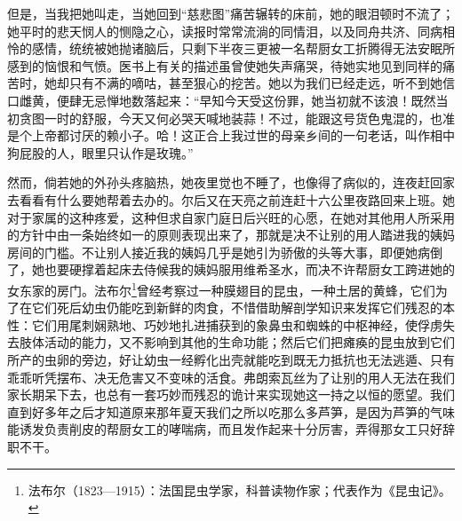 \par 但是，当我把她叫走，当她回到“慈悲图”痛苦辗转的床前，她的眼泪顿时不流了；她平时的悲天悯人的恻隐之心，读报时常常流淌的同情泪，以及同舟共济、同病相怜的感情，统统被她抛诸脑后，只剩下半夜三更被一名帮厨女工折腾得无法安眠所感到的恼恨和气愤。医书上有关的描述虽曾使她失声痛哭，待她实地见到同样的痛苦时，她却只有不满的嘀咕，甚至狠心的挖苦。她以为我们已经走远，听不到她信口雌黄，便肆无忌惮地数落起来：“早知今天受这份罪，她当初就不该浪！既然当初贪图一时的舒服，今天又何必哭天喊地装蒜！不过，能跟这号货色鬼混的，也准是个上帝都讨厌的赖小子。哈！这正合上我过世的母亲乡间的一句老话，叫作相中狗屁股的人，眼里只认作是玫瑰。”
\par 然而，倘若她的外孙头疼脑热，她夜里觉也不睡了，也像得了病似的，连夜赶回家去看看有什么要她帮着去办的。尔后又在天亮之前连赶十六公里夜路回来上班。她对于家属的这种疼爱，这种但求自家门庭日后兴旺的心愿，在她对其他用人所采用的方针中由一条始终如一的原则表现出来了，那就是决不让别的用人踏进我的姨妈房间的门槛。不让别人接近我的姨妈几乎是她引为骄傲的头等大事，即便她病倒了，她也要硬撑着起床去侍候我的姨妈服用维希圣水，而决不许帮厨女工跨进她的女东家的房门。法布尔\footnote{法布尔（1823—1915）：法国昆虫学家，科普读物作家；代表作为《昆虫记》。}曾经考察过一种膜翅目的昆虫，一种土居的黄蜂，它们为了在它们死后幼虫仍能吃到新鲜的肉食，不惜借助解剖学知识来发挥它们残忍的本性：它们用尾刺娴熟地、巧妙地扎进捕获到的象鼻虫和蜘蛛的中枢神经，使俘虏失去肢体活动的能力，又不影响到其他的生命功能；然后它们把瘫痪的昆虫放到它们所产的虫卵的旁边，好让幼虫一经孵化出壳就能吃到既无力抵抗也无法逃遁、只有乖乖听凭摆布、决无危害又不变味的活食。弗朗索瓦丝为了让别的用人无法在我们家长期呆下去，也总有一套巧妙而残忍的诡计来实现她这一持之以恒的愿望。我们直到好多年之后才知道原来那年夏天我们之所以吃那么多芦笋，是因为芦笋的气味能诱发负责削皮的帮厨女工的哮喘病，而且发作起来十分厉害，弄得那女工只好辞职不干。
